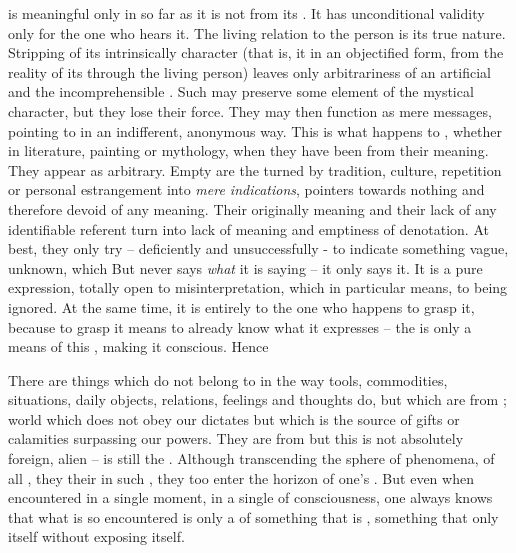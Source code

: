  is meaningful only in so far as it is not  from its
.  It has unconditional validity only for the one who hears it.  The
living relation to the  person is its true nature.  Stripping
 of its intrinsically  character (that is,
 it in an {objectified} form,  from the
reality of its  through the living person) leaves only
arbitrariness of an artificial  and the incomprehensible . Such  may preserve some element of the mystical character,
but they lose their  force.  They may then function as mere
messages,  pointing to  in an indifferent, anonymous
way.  This is what happens to , whether in literature, painting or
mythology, when they have been  from their 
meaning.  They appear as arbitrary.  Empty  are the  turned by tradition, culture, repetition or personal estrangement
into {\em mere indications}, pointers towards nothing and therefore devoid of
any  meaning.  Their originally  meaning and their lack
of any identifiable referent turn into lack of meaning and emptiness of
denotation.  At best, they only try -- deficiently and unsuccessfully - to
indicate something vague, unknown, which  But  never says {\em what} it is saying -- it only says it.
It is a pure expression, totally open to misinterpretation, which in particular
means, to being ignored. At the same time, it is entirely  to the one who
happens to grasp it, because to grasp it means to already know what it
expresses -- the  is only a means of  this
, making it conscious.  Hence 


There are things which do not belong to  in the way tools,
commodities, situations, daily objects, relations, feelings and thoughts do, but
which are from ; world which does not obey our dictates but
which is the source of gifts or calamities surpassing our powers.  They are
from  but this  is not absolutely foreign,
alien --  is still the .  Although transcending the
sphere of phenomena, of all , they  their
 in such , they too enter the horizon of one's
.  But even when encountered in a single moment, in a single 
 of  consciousness, one always knows that what is so 
encountered is only a  of something that is
, something that only  itself without
exposing itself.

